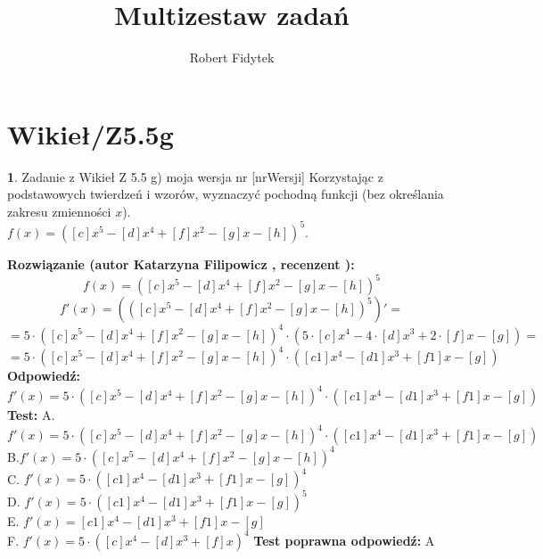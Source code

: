 \documentclass[12pt, a4paper]{article}
\title{Multizestaw zadań}
\author{Robert Fidytek}
\date{}
\theoremstyle{definition} %
\newtheorem{zad}{}
\newcommand{\kategoria}[1]{\section{#1}} %
\newcommand{\zadStart}[1]{\begin{zad}#1\newline} %
\newcommand{\zadStop}{\end{zad}}   %
\newcommand{\rozwStart}[2]{\noindent \textbf{Rozwiązanie (autor #1 , recenzent #2): }\newline} %
\newcommand{\rozwStop}{\newline}                                            %
\newcommand{\odpStart}{\noindent \textbf{Odpowiedź:}\newline}    %
\newcommand{\odpStop}{\newline}                                             %
\newcommand{\testStart}{\noindent \textbf{Test:}\newline} %
\newcommand{\testStop}{\newline} %
\newcommand{\kluczStart}{\noindent \textbf{Test poprawna odpowiedź:}\newline} %
\newcommand{\kluczStop}{\newline} %
\begin{document}
\maketitle


\kategoria{Wikieł/Z5.5g}
\zadStart{Zadanie z Wikieł Z 5.5 g) moja wersja nr [nrWersji]}
Korzystając z podstawowych twierdzeń i wzorów, wyznaczyć pochodną funkcji (bez określania zakresu zmienności $x$).\\
$f(x)=([c]x^5-[d]x^4+[f]x^2-[g]x-[h])^5$.
\zadStop
\rozwStart{Katarzyna Filipowicz}{}
$$f(x)=([c]x^5-[d]x^4+[f]x^2-[g]x-[h])^5$$
$$f'(x)=(([c]x^5-[d]x^4+[f]x^2-[g]x-[h])^5)' = $$
$$ =5\cdot ([c]x^5-[d]x^4+[f]x^2-[g]x-[h])^4\cdot( 5\cdot [c]x^4-4 \cdot [d]x^3+ 2\cdot [f]x-[g] )= $$
$$ = 5\cdot ([c]x^5-[d]x^4+[f]x^2-[g]x-[h])^4\cdot( [c1]x^4- [d1]x^3+ [f1]x-[g] )$$
\rozwStop
\odpStart
$ f'(x)=5\cdot ([c]x^5-[d]x^4+[f]x^2-[g]x-[h])^4\cdot( [c1]x^4- [d1]x^3+ [f1]x-[g] )$
\odpStop
\testStart
A.$ f'(x)=5\cdot ([c]x^5-[d]x^4+[f]x^2-[g]x-[h])^4\cdot( [c1]x^4- [d1]x^3+ [f1]x-[g] ) $\\
B.$ f'(x)=5\cdot ([c]x^5-[d]x^4+[f]x^2-[g]x-[h])^4 $ \\
C. $ f'(x)=5\cdot ( [c1]x^4- [d1]x^3+ [f1]x-[g] )^4 $\\
D. $ f'(x)=5\cdot ( [c1]x^4- [d1]x^3+ [f1]x-[g] )^5 $\\
E. $ f'(x)= [c1]x^4- [d1]x^3+ [f1]x-[g] $\\
F. $ f'(x)=5\cdot ([c]x^4-[d]x^3+[f]x)^4$
\testStop
\kluczStart
A
\kluczStop
\end{document}
